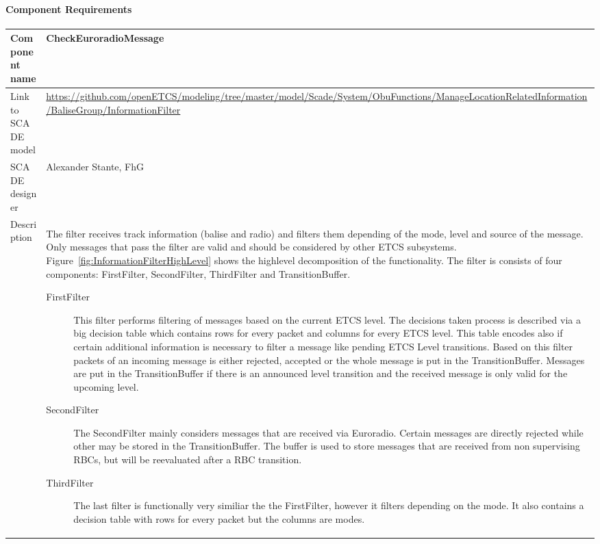 
\paragraph{Component Requirements}

\begin{longtable}{p{}p{}}
\toprule
Component name			& CheckEuroradioMessage \\
\midrule
Link to SCADE model		& {\footnotesize \url{https://github.com/openETCS/modeling/tree/master/model/Scade/System/ObuFunctions/ManageLocationRelatedInformation/BaliseGroup/InformationFilter}} \\
\midrule
SCADE designer			& Alexander Stante, FhG \\
\midrule
Description				& The filter receives track information (balise and radio) and filters them depending of the mode, level and source of the message. Only messages that pass the filter are valid and should be considered by other ETCS subsystems. Figure~\ref{fig:InformationFilterHighLevel} shows the high\-level decomposition of the functionality. The filter is consists of four  components: FirstFilter, SecondFilter, ThirdFilter and TransitionBuffer.

\begin{description}
\item[FirstFilter] This filter performs filtering of messages
based on the current ETCS level. The decisions taken process is
described via a big decision table which contains rows for every
packet and columns for every ETCS level. This table encodes also if
certain additional information is necessary to filter a message like
pending ETCS Level transitions. Based on this filter packets of an
incoming message is either rejected, accepted or the whole message is
put in the TransitionBuffer. Messages are put in the TransitionBuffer
if there is an announced level transition and the received message is
only valid for the upcoming level.

\item[SecondFilter] The SecondFilter mainly considers messages
that are received via Euroradio. Certain messages are directly
rejected while other may be stored in the TransitionBuffer. The buffer
is used to store messages that are received from non supervising RBCs,
but will be reevaluated after a RBC transition.

\item[ThirdFilter] The last filter is functionally very similiar
the the FirstFilter, however it filters depending on the mode. It also
contains a decision table with rows for every packet but the columns
are modes.


\end{description}
\end{longtable}
